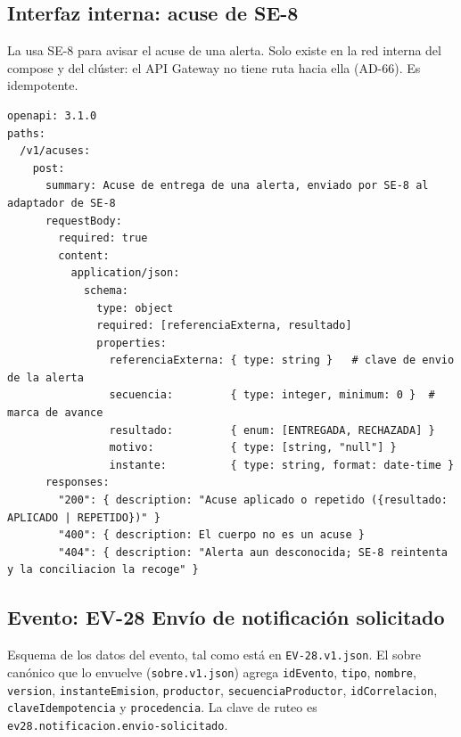 \documentclass[11pt,letterpaper]{article}
\begin{document}
\subsection{Interfaz interna: acuse de SE-8}

La usa SE-8 para avisar el acuse de una alerta. Solo existe en la red interna del compose y del
clúster: el API Gateway no tiene ruta hacia ella (AD-66). Es idempotente.

\begingroup\footnotesize
\begin{verbatim}
openapi: 3.1.0
paths:
  /v1/acuses:
    post:
      summary: Acuse de entrega de una alerta, enviado por SE-8 al adaptador de SE-8
      requestBody:
        required: true
        content:
          application/json:
            schema:
              type: object
              required: [referenciaExterna, resultado]
              properties:
                referenciaExterna: { type: string }   # clave de envio de la alerta
                secuencia:         { type: integer, minimum: 0 }  # marca de avance
                resultado:         { enum: [ENTREGADA, RECHAZADA] }
                motivo:            { type: [string, "null"] }
                instante:          { type: string, format: date-time }
      responses:
        "200": { description: "Acuse aplicado o repetido ({resultado: APLICADO | REPETIDO})" }
        "400": { description: El cuerpo no es un acuse }
        "404": { description: "Alerta aun desconocida; SE-8 reintenta y la conciliacion la recoge" }
\end{verbatim}
\endgroup

\subsection{Evento: EV-28 Envío de notificación solicitado}

Esquema de los datos del evento, tal como está en \texttt{EV-28.v1.json}. El sobre canónico que lo
envuelve (\texttt{sobre.v1.json}) agrega \texttt{idEvento}, \texttt{tipo}, \texttt{nombre},
\texttt{version}, \texttt{instanteEmision}, \texttt{productor}, \texttt{secuenciaProductor},
\texttt{idCorrelacion}, \texttt{claveIdempotencia} y \texttt{procedencia}. La clave de ruteo es
\texttt{ev28.notificacion.envio-solicitado}.
\end{document}
